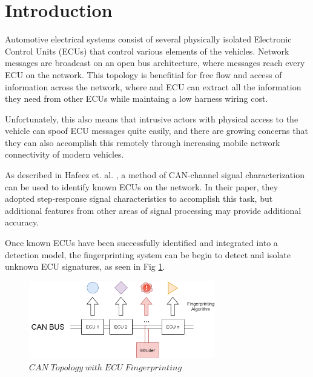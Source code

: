 \documentclass[conference]{IEEEtran}
\begin{document}
\maketitle



\section{Introduction}

Automotive electrical systems consist of several physically isolated Electronic Control Units (ECUs) that control various elements of the vehicles. Network messages are broadcast on an open bus architecture, where messages reach every ECU on the network. This topology is benefitial for free flow and access of information across the network, where and ECU can extract all the information they need from other ECUs while maintaing a low harness wiring cost.

Unfortunately, this also means that intrusive actors with physical access to the vehicle can spoof ECU messages quite easily, and there are growing concerns that they can also accomplish this remotely through increasing mobile network connectivity of modern vehicles.

As described in Hafeez et. al. \cite{hafeez2019}, a method of CAN-channel signal characterization can be used to identify known ECUs on the network. In their paper, they adopted step-response signal characteristics to accomplish this task, but additional features from other areas of signal processing may provide additional accuracy.

Once known ECUs have been successfully identified and integrated into a detection model, the fingerprinting system can be begin to detect and isolate unknown ECU signatures, as seen in Fig \ref{fig:NetworkTopology}.

\begin{figure}[htb]
\centering
\includegraphics[width=3.2in]{figures/01_Fingerprinting.png}
\caption{$CAN  \; Topology  \; with  \; ECU \;  Fingerprinting$}
\label{fig:NetworkTopology}
\end{figure}
\end{document}
